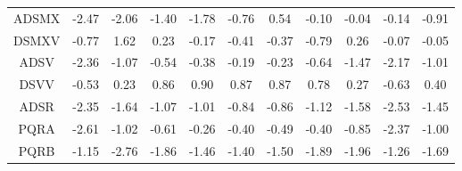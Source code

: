 \documentclass[11pt,a4paper]{report}
\begin{document}
\begin{centering}
\begin{adjustwidth}{-2in}{-1in}
\begin{longtable}{ | c || c | c | c | c | c | c | c | c | c || c |}
ADSMX &  \cellcolor[HTML]{FFBFBF} -2.47 &  \cellcolor[HTML]{FFCFCF} -2.06 &  \cellcolor[HTML]{FFDFDF} -1.40 &  \cellcolor[HTML]{FFCFCF} -1.78 &  \cellcolor[HTML]{FFEFEF} -0.76 &  \cellcolor[HTML]{EFEFFF} 0.54 &  \cellcolor[HTML]{FFFFFF} -0.10 &  \cellcolor[HTML]{FFFFFF} -0.04 &  \cellcolor[HTML]{FFFFFF} -0.14 &  \cellcolor[HTML]{FFE7E7} -0.91 \\
DSMXV &  \cellcolor[HTML]{FFEFEF} -0.77 &  \cellcolor[HTML]{D7D7FF} 1.62 &  \cellcolor[HTML]{F7F7FF} 0.23 &  \cellcolor[HTML]{FFF7F7} -0.17 &  \cellcolor[HTML]{FFF7F7} -0.41 &  \cellcolor[HTML]{FFF7F7} -0.37 &  \cellcolor[HTML]{FFEFEF} -0.79 &  \cellcolor[HTML]{F7F7FF} 0.26 &  \cellcolor[HTML]{FFFFFF} -0.07 &  \cellcolor[HTML]{FFFFFF} -0.05 \\
ADSV &  \cellcolor[HTML]{FFC7C7} -2.36 &  \cellcolor[HTML]{FFE7E7} -1.07 &  \cellcolor[HTML]{FFEFEF} -0.54 &  \cellcolor[HTML]{FFF7F7} -0.38 &  \cellcolor[HTML]{FFF7F7} -0.19 &  \cellcolor[HTML]{FFF7F7} -0.23 &  \cellcolor[HTML]{FFEFEF} -0.64 &  \cellcolor[HTML]{FFD7D7} -1.47 &  \cellcolor[HTML]{FFC7C7} -2.17 &  \cellcolor[HTML]{FFE7E7} -1.01 \\
DSVV &  \cellcolor[HTML]{FFEFEF} -0.53 &  \cellcolor[HTML]{F7F7FF} 0.23 &  \cellcolor[HTML]{E7E7FF} 0.86 &  \cellcolor[HTML]{E7E7FF} 0.90 &  \cellcolor[HTML]{E7E7FF} 0.87 &  \cellcolor[HTML]{E7E7FF} 0.87 &  \cellcolor[HTML]{EFEFFF} 0.78 &  \cellcolor[HTML]{F7F7FF} 0.27 &  \cellcolor[HTML]{FFEFEF} -0.63 &  \cellcolor[HTML]{F7F7FF} 0.40 \\
ADSR &  \cellcolor[HTML]{FFC7C7} -2.35 &  \cellcolor[HTML]{FFD7D7} -1.64 &  \cellcolor[HTML]{FFE7E7} -1.07 &  \cellcolor[HTML]{FFE7E7} -1.01 &  \cellcolor[HTML]{FFE7E7} -0.84 &  \cellcolor[HTML]{FFE7E7} -0.86 &  \cellcolor[HTML]{FFDFDF} -1.12 &  \cellcolor[HTML]{FFD7D7} -1.58 &  \cellcolor[HTML]{FFBFBF} -2.53 &  \cellcolor[HTML]{FFD7D7} -1.45 \\
PQRA &  \cellcolor[HTML]{FFBFBF} -2.61 &  \cellcolor[HTML]{FFE7E7} -1.02 &  \cellcolor[HTML]{FFEFEF} -0.61 &  \cellcolor[HTML]{FFF7F7} -0.26 &  \cellcolor[HTML]{FFF7F7} -0.40 &  \cellcolor[HTML]{FFEFEF} -0.49 &  \cellcolor[HTML]{FFF7F7} -0.40 &  \cellcolor[HTML]{FFE7E7} -0.85 &  \cellcolor[HTML]{FFC7C7} -2.37 &  \cellcolor[HTML]{FFE7E7} -1.00 \\
PQRB &  \cellcolor[HTML]{FFDFDF} -1.15 &  \cellcolor[HTML]{FFB7B7} -2.76 &  \cellcolor[HTML]{FFCFCF} -1.86 &  \cellcolor[HTML]{FFD7D7} -1.46 &  \cellcolor[HTML]{FFDFDF} -1.40 &  \cellcolor[HTML]{FFD7D7} -1.50 &  \cellcolor[HTML]{FFCFCF} -1.89 &  \cellcolor[HTML]{FFCFCF} -1.96 &  \cellcolor[HTML]{FFDFDF} -1.26 &  \cellcolor[HTML]{FFD7D7} -1.69 \\

\end{longtable}
\end{adjustwidth}
\end{centering}
\end{document}
